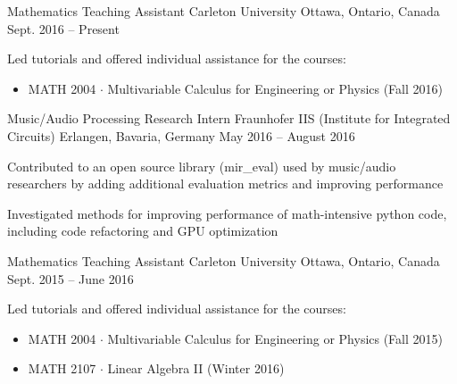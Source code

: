 

\begin{cventries}

    \cventry
      {Mathematics Teaching Assistant} %
      {Carleton University} %
      {Ottawa, Ontario, Canada} %
      {Sept. 2016 – Present} %
      {
        \begin{cvitems} %
          \item {Led tutorials and offered individual assistance for the courses:}
            \begin{itemize}
              \item {MATH 2004 $\cdot$ Multivariable Calculus for Engineering or Physics (Fall 2016)}
            \end{itemize}
        \end{cvitems}
      }

  \cventry
    {Music/Audio Processing Research Intern} %
    {Fraunhofer IIS (Institute for Integrated Circuits)} %
    {Erlangen, Bavaria, Germany} %
    {May 2016 – August 2016} %
    {
      \begin{cvitems} %
        \item {Contributed to an open source library (mir\_eval) used by music/audio researchers by adding additional evaluation metrics and improving performance}
        \item {Investigated methods for improving performance of math-intensive python code, including code refactoring and GPU optimization}
      \end{cvitems}
    }

  \cventry
    {Mathematics Teaching Assistant} %
    {Carleton University} %
    {Ottawa, Ontario, Canada} %
    {Sept. 2015 – June 2016} %
    {
      \begin{cvitems} %
        \item {Led tutorials and offered individual assistance for the courses:}
          \begin{itemize}
            \item {MATH 2004 $\cdot$ Multivariable Calculus for Engineering or Physics (Fall 2015)}
            \item {MATH 2107 $\cdot$ Linear Algebra II (Winter 2016)}
          \end{itemize}
      \end{cvitems}
    }


\end{cventries}
